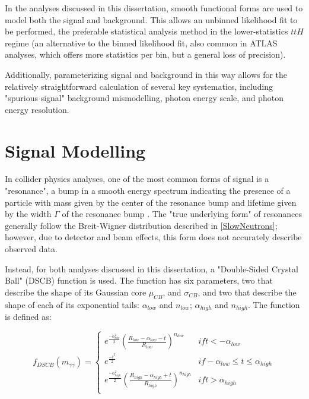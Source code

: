 In the analyses discussed in this dissertation, smooth functional forms are used to model both the signal and background. This allows an unbinned likelihood fit to be performed, the preferable statistical analysis method in the lower-statistics $ttH$ regime (an alternative to the binned likelihood fit, also common in ATLAS analyses, which offers more statistics per bin, but a general loss of precision). 

Additionally, parameterizing signal and background in this way allows for the relatively straightforward calculation of several key systematics, including "spurious signal" background mismodelling, photon energy scale, and photon energy resolution.

\section{Signal Modelling} \label{sec:example_section} 

In collider physics analyses, one of the most common forms of signal is a "resonance", a bump in a smooth energy spectrum indicating the presence of a particle with mass given by the center of the resonance bump and lifetime given by the width $\Gamma$ of the resonance bump \cite{Peskin}. The "true underlying form" of resonances generally follow the Breit-Wigner distribution described in \ref{SlowNeutrons}; however, due to detector and beam effects, this form does not accurately describe observed data.

Instead, for both analyses discussed in this dissertation, a "Double-Sided Crystal Ball" (DSCB) function \cite{CB}\cite{DSCB} is used. The function has six parameters, two that describe the shape of its Gaussian core $\mu_{CB}$, and $\sigma_{CB}$, and two that describe the shape of each of its exponential tails: $\alpha_{low}$ and $n_{low}$; $\alpha_{high}$ and $n_{high}$. The function is defined as:

\[f_{DSCB}(m_{\gamma \gamma}) = \begin{cases} 
      e^{\frac{-{\alpha_{low}^{2}}}{2}} (\frac{R_{low}-\alpha_{low}-t}{R_{low}})^{n_{low}} & if t < -\alpha_{low} \\
      e^{\frac{-t^{2}}{2}} & if -\alpha_{low} \leq t \leq \alpha_{high} \\
      e^{\frac{-{\alpha_{high}^{2}}}{2}} (\frac{R_{high}-\alpha_{high}+t}{R_{high}})^{n_{high}} & if t > \alpha_{high} \\
   \end{cases}
\]

